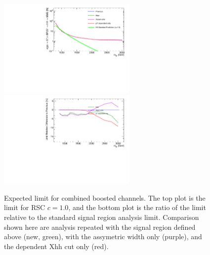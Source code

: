 \begin{figure}[htbp!]
\begin{center}
\includegraphics[width=0.6\textwidth,angle=-90]{figures/boosted/AppendixOptimization/CompareLimits_HH_BoostedNewRun2-test-SR_c10.pdf}\\
\includegraphics[width=0.6\textwidth,angle=-90]{figures/boosted/AppendixOptimization/CompareLimits_HH_BoostedNewRun2-test-SR_c10_ratio.pdf}
  \caption{Expected limit for combined boosted channels. The top plot is the limit for RSC $c=1.0$, and the bottom plot is the ratio of the limit relative to the standard signal region analysis limit. Comparison shown here are analysis repeated with the signal region defined above (new, green), with the assymetric width only (purple), and the \pt dependent Xhh cut only (red).}
  \label{fig:app-optimization-sr}
\end{center}
\end{figure}
